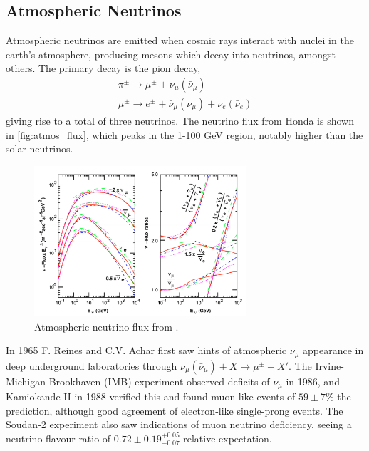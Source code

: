 \subsection{Atmospheric Neutrinos}
Atmospheric neutrinos are emitted when cosmic rays interact with nuclei in the earth's atmosphere, producing mesons which decay into neutrinos, amongst others. The primary decay is the pion decay,
\begin{gather*}
	\pi^\pm \rightarrow \mu^\pm + \nu_\mu(\bar{\nu}_\mu) \\
	\mu^\pm \rightarrow e^\pm + \bar{\nu}_\mu (\nu_\mu) + \nu_e (\bar{\nu}_e)
\end{gather*}
giving rise to a total of three neutrinos. The neutrino flux from Honda\cite{honda_flux} is shown in \autoref{fig:atmos_flux}, which peaks in the 1-100 GeV region, notably higher than the solar neutrinos.
\begin{figure}[h]
	\includegraphics[width=0.7\textwidth, trim={0mm 0mm 0mm 0mm}, clip,page=1]{figures/theory/honda_flux}
	\caption{Atmospheric neutrino flux from \cite{honda_flux}.}
	\label{fig:atmos_flux}
\end{figure}

In 1965 F. Reines\cite{reines_atmos} and C.V. Achar\cite{india_atmos_hint} first saw hints of atmospheric $\nu_\mu$ appearance in deep underground laboratories through $\nu_\mu(\bar{\nu}_\mu) + X \rightarrow \mu^\pm + X'$. The Irvine-Michigan-Brookhaven (IMB) experiment\cite{imb} observed deficits of $\nu_\mu$ in 1986, and Kamiokande II in 1988\cite{kamiokande_atmos_hint} verified this and found muon-like events of $59\pm7\%$ the prediction, although good agreement of electron-like single-prong events. The Soudan-2 experiment\cite{soudan2} also saw indications of muon neutrino deficiency, seeing a neutrino flavour ratio of $0.72\pm0.19^{+0.05}_{-0.07}$ relative expectation. 

